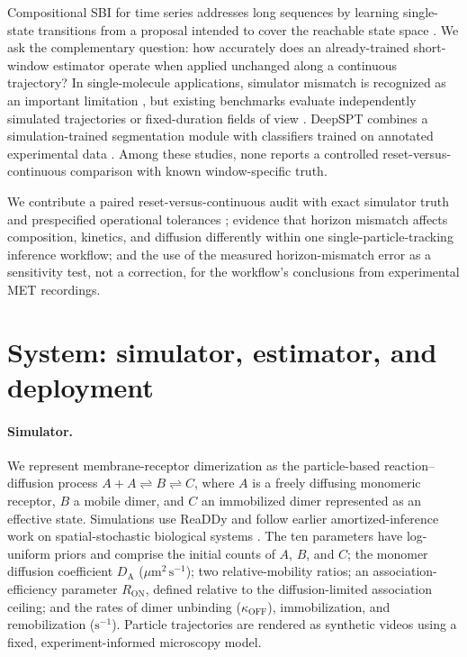 \documentclass{article}
\newcommand{\DA}{D_{\mathrm{A}}}
\newcommand{\koff}{\kappa_{\mathrm{OFF}}}
\begin{document}
Compositional SBI for time series addresses long sequences by learning
single-state transitions from a proposal intended to cover the reachable
state space \citep{gloeckler2025compositional}. We ask the complementary
question: how accurately does an already-trained short-window estimator
operate when applied unchanged along a continuous trajectory? In
single-molecule applications, simulator mismatch is recognized as an
important limitation \citep{dingeldein2025simulation}, but existing
benchmarks evaluate independently simulated trajectories or fixed-duration
fields of view
\citep{munozgil2021objective,munozgil2025quantitative}. DeepSPT combines a
simulation-trained segmentation module with classifiers trained on annotated
experimental data \citep{kaestelhansen2025deep}. Among these studies, none
reports a controlled reset-versus-continuous comparison with known
window-specific truth.

We contribute a paired reset-versus-continuous audit with exact simulator
truth and prespecified operational tolerances \citep{lakens2018equivalence};
evidence that horizon mismatch affects composition, kinetics, and diffusion
differently within one single-particle-tracking inference workflow; and the
use of the measured horizon-mismatch error as a sensitivity test, not a
correction, for the workflow's conclusions from experimental MET recordings.

\section{System: simulator, estimator, and deployment}
\label{sec:system}

\paragraph{Simulator.} We represent membrane-receptor dimerization as the
particle-based reaction--diffusion process
$A + A \rightleftharpoons B \rightleftharpoons C$, where $A$ is a freely
diffusing monomeric receptor, $B$ a mobile dimer, and $C$ an immobilized
dimer represented as an effective state. Simulations use ReaDDy
\citep{hoffmann2019readdy} and follow earlier amortized-inference work on
spatial-stochastic biological systems \citep{ramirezsierra2025sgm}. The ten
parameters have log-uniform priors and comprise the initial counts of
$A$, $B$, and $C$; the monomer diffusion coefficient $\DA$
($\mu\mathrm{m}^2\,\mathrm{s}^{-1}$); two relative-mobility ratios; an
association-efficiency parameter $R_{\mathrm{ON}}$, defined relative to the
diffusion-limited association ceiling; and the rates of dimer unbinding ($\koff$), immobilization, and
remobilization ($\mathrm{s}^{-1}$). Particle trajectories are rendered as synthetic
videos using a fixed, experiment-informed microscopy model.
\end{document}
